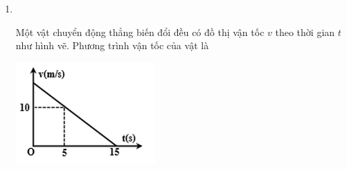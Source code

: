 \begin{enumerate}[label=\bfseries Câu \arabic*:]
\item {}\\
{\begin{minipage}[l]{0.7\textwidth}
Một vật chuyển động thẳng biến đổi đều có đồ thị vận tốc $v$ theo thời gian $t$ như hình vẽ. Phương trình vận tốc của vật là
	\end{minipage}
	\begin{minipage}{0.3\textwidth}
		\begin{center}
			\includegraphics[width=0.8\linewidth]{../figs/VN10-2023-PH-TP009-P-2}
		\end{center}
	\end{minipage}
}


\end{enumerate}
